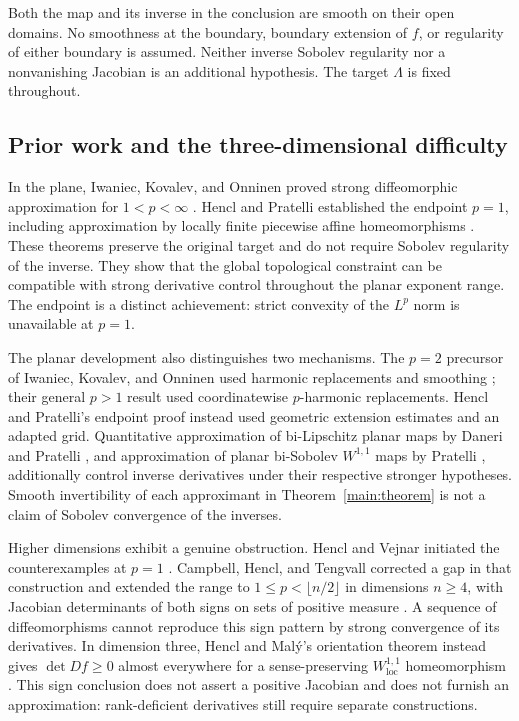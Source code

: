 \documentclass[11pt]{article}
\numberwithin{equation}{section}
\theoremstyle{definition}
\theoremstyle{remark}
\begin{document}
Both the map and its inverse in the conclusion are smooth on their open domains. No smoothness at the boundary, boundary extension of $f$, or regularity of either boundary is assumed. Neither inverse Sobolev regularity nor a nonvanishing Jacobian is an additional hypothesis. The target $\Lambda$ is fixed throughout.

\subsection{Prior work and the three-dimensional difficulty}

In the plane, Iwaniec, Kovalev, and Onninen proved strong diffeomorphic
approximation for $1<p<\infty$
\cite[Theorem~1.1]{IwaniecKovalevOnninen2011}. Hencl and Pratelli
established the endpoint $p=1$, including approximation by locally
finite piecewise affine homeomorphisms
\cite[Theorem~1.1]{HenclPratelli2018}. These theorems preserve the
original target and do not require Sobolev regularity of the inverse.
They show that the global topological constraint can be compatible
with strong derivative control throughout the planar exponent range.
The endpoint is a distinct achievement: strict convexity of the
$L^p$ norm is unavailable at $p=1$.

The planar development also distinguishes two mechanisms. The
$p=2$ precursor of Iwaniec, Kovalev, and Onninen used harmonic
replacements and smoothing \cite{IwaniecKovalevOnninen2012}; their
general $p>1$ result used coordinatewise $p$-harmonic replacements.
Hencl and Pratelli's endpoint proof instead used geometric extension
estimates and an adapted grid. Quantitative approximation of
bi-Lipschitz planar maps by Daneri and Pratelli
\cite{DaneriPratelli2014}, and approximation of planar bi-Sobolev
$W^{1,1}$ maps by Pratelli \cite{Pratelli2017}, additionally control
inverse derivatives under their respective stronger hypotheses.
Smooth invertibility of each approximant in Theorem~\ref{main:theorem}
is not a claim of Sobolev convergence of the inverses.

Higher dimensions exhibit a genuine obstruction. Hencl and Vejnar
initiated the counterexamples at $p=1$ \cite{HenclVejnar2016}.
Campbell, Hencl, and Tengvall corrected a gap in that construction and
extended the range to $1\le p<\lfloor n/2\rfloor$ in dimensions
$n\ge4$, with Jacobian determinants of both signs on sets of positive
measure \cite{CampbellHenclTengvall2018}. A sequence of diffeomorphisms cannot
reproduce this sign pattern by strong convergence of its derivatives.
In dimension three, Hencl and Mal\'y's orientation theorem instead
gives $\det Df\ge0$ almost everywhere for a sense-preserving
$W^{1,1}_{\mathrm{loc}}$ homeomorphism
\cite[Theorem~1.1]{HenclMaly2010}. This sign conclusion does not
assert a positive Jacobian and does not furnish an approximation:
rank-deficient derivatives still require separate constructions.
\end{document}
